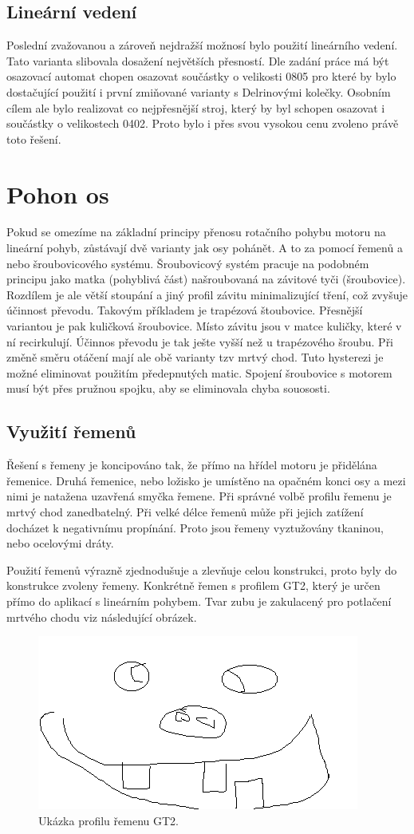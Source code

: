 \subsection{Lineární vedení}
Poslední zvažovanou a zároveň nejdražší možnosí bylo použití lineárního vedení. Tato varianta slibovala dosažení největších přesností. Dle zadání práce má být osazovací automat chopen osazovat součástky o velikosti 0805 pro které by bylo dostačující použití i první zmiňované varianty s Delrinovými kolečky. Osobním cílem ale bylo realizovat co nejpřesnější stroj, který by byl schopen  osazovat i součástky o velikostech 0402. Proto bylo i přes svou vysokou cenu zvoleno právě toto řešení.

\section{Pohon os}
Pokud se omezíme na základní principy přenosu rotačního pohybu motoru na lineární pohyb, zůstávají dvě varianty jak osy pohánět. A to za pomocí řemenů a nebo šroubovicového systému.
Šroubovicový systém pracuje na podobném principu jako matka (pohyblivá část) našroubovaná na závitové tyči (šroubovice). Rozdílem je ale větší stoupání a jiný profil závitu minimalizující tření, což zvyšuje účinnost převodu. Takovým příkladem je trapézová štoubovice. Přesnější variantou je pak kuličková šroubovice. Místo závitu jsou v matce kuličky, které v ní recirkulují. Účinnos převodu je tak ješte vyšší než u trapézového šroubu. Při změně směru otáčení mají ale obě varianty tzv mrtvý chod. Tuto hysterezi je možné eliminovat použitím předepnutých matic.
Spojení šroubovice s motorem musí být přes pružnou spojku, aby se eliminovala chyba souososti.

\subsection{Využití řemenů}%
Řešení s řemeny je koncipováno tak, že přímo na hřídel motoru je přidělána řemenice. Druhá řemenice, nebo ložisko je umístěno na opačném konci osy a mezi nimi je natažena uzavřená smyčka řemene.
Při správné volbě profilu řemenu je mrtvý chod zanedbatelný. Při velké délce řemenů může při jejich zatížení docházet k negativnímu propínání. Proto jsou řemeny vyztužovány tkaninou, nebo ocelovými dráty.

Použití řemenů výrazně zjednodušuje a zlevňuje celou konstrukci, proto byly do konstrukce zvoleny řemeny. Konkrétně řemen s profilem GT2, který je určen přímo do aplikací s lineárním pohybem. Tvar zubu je zakulacený pro potlačení mrtvého chodu viz následující obrázek.
\begin{figure}[H]
  \centering
    \includegraphics[width=0.5\linewidth]{obrazky/placeholder.png}%
    \caption{Ukázka profilu řemenu GT2.}
    \label{fig:GT2}
\end{figure}


